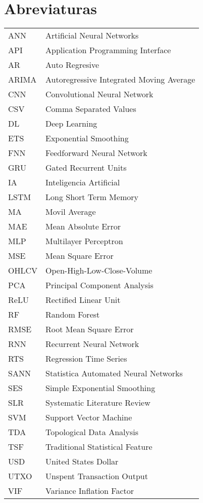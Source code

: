 \chapter*{Abreviaturas}\label{LstAbb} 

\begin{flushleft}
\begin{longtable}{lp{11cm}}

ANN & Artificial Neural Networks\\
API & Application Programming Interface\\
AR & Auto Regresive\\
ARIMA & Autoregressive Integrated Moving Average\\
CNN & Convolutional Neural Network\\
CSV & Comma Separated Values\\
DL & Deep Learning \\
ETS & Exponential Smoothing\\
FNN & Feedforward Neural Network\\ 
GRU & Gated Recurrent Units \\
IA & Inteligencia Artificial \\
LSTM & Long Short Term Memory\\
MA & Movil Average\\
MAE & Mean Absolute Error\\
MLP & Multilayer Perceptron \\
MSE & Mean Square Error\\
OHLCV & Open-High-Low-Close-Volume\\
PCA & Principal Component Analysis\\
ReLU & Rectified Linear Unit\\
RF & Random Forest\\
RMSE & Root Mean Square Error\\
RNN & Recurrent Neural Network \\
RTS & Regression Time Series\\
SANN & Statistica Automated Neural Networks \\
SES & Simple Exponential Smoothing\\
SLR & Systematic Literature Review\\
SVM & Support Vector Machine\\
TDA & Topological Data Analysis\\
TSF & Traditional Statistical Feature\\
USD & United States Dollar \\
UTXO & Unspent Transaction Output \\
VIF & Variance Inflation Factor

\end{longtable}
\end{flushleft}
